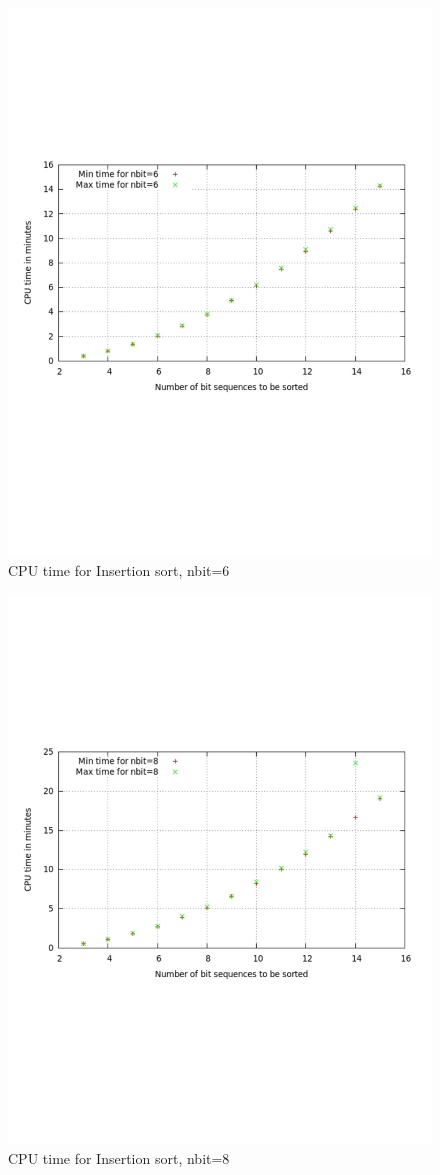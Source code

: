 \documentclass[12pt]{article}
\begin{document}
\begin{figure}%
\centering
\includegraphics[width=12cm]{fsort8.pdf} 
\caption{CPU time for Insertion sort, nbit=6} 
\label{fig:image_sf8} %
\end{figure}


\begin{figure}%
\centering
\includegraphics[width=12cm]{fsort7.pdf} 
\caption{CPU time for Insertion sort, nbit=8} 
\label{fig:image_sf7} %
\end{figure}
\end{document}
